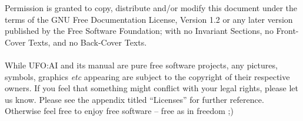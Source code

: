 


\thispagestyle{empty} %
Permission is granted to copy, distribute and/or modify this document under the terms of the GNU Free Documentation License, Version 1.2 or any later version published by the Free Software Foundation; with no Invariant Sections, no Front-Cover Texts, and no Back-Cover Texts.\\
\\
While UFO:AI and its manual are pure free software projects, any pictures, symbols, graphics \emph{etc} appearing are subject to the copyright of their respective owners. If you feel that something might conflict with your legal rights, please let us know. Please see the appendix titled ``Licenses'' for further reference. Otherwise feel free to enjoy free software -- free as in freedom ;)

\maketitle
\thispagestyle{empty} %
\newpage
\tableofcontents











\appendix





